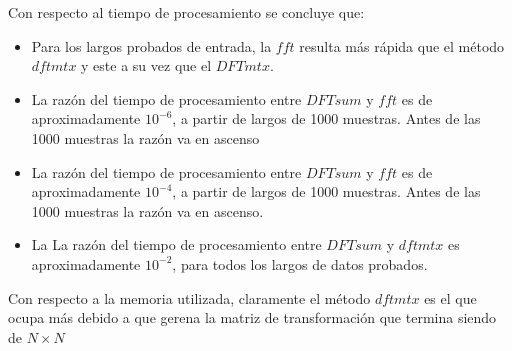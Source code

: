 \begin{enumerate}
    Con respecto al tiempo de procesamiento se concluye que:
    \begin{itemize}
        \item Para los largos probados de entrada, la $fft$ resulta más rápida que el método $dftmtx$ y este a su vez que el $DFTmtx$.
        \item La razón del tiempo de procesamiento entre $DFTsum$ y $fft$ es de aproximadamente $10^{-6}$, a partir de largos de 1000 muestras. Antes de las 1000 muestras la razón va en ascenso
        \item La razón del tiempo de procesamiento entre $DFTsum$ y $fft$ es de aproximadamente $10^{-4}$, a partir de largos de 1000 muestras.  Antes de las 1000 muestras la razón va en ascenso.
        \item La La razón del tiempo de procesamiento entre $DFTsum$ y $dftmtx$ es aproximadamente $10^{-2}$, para todos los largos de datos probados.
    \end{itemize}
    
    Con respecto a la memoria utilizada, claramente el método $dftmtx$ es el que ocupa más debido a que gerena la matriz de transformación que termina siendo de $N\times N$
    
    

    


    
    \end{enumerate} 
    


